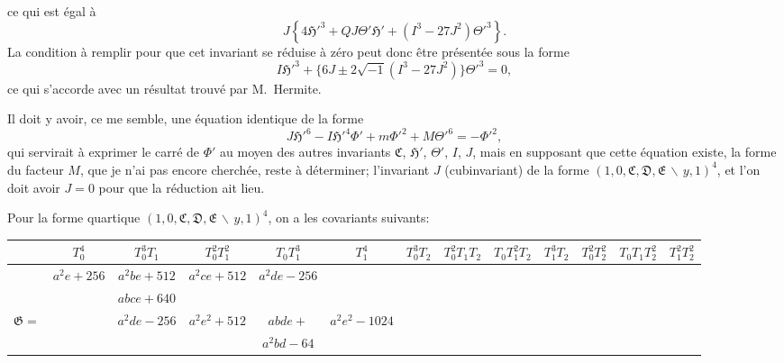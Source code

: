 \documentclass[11pt,a4paper]{article}
\theoremstyle{definition}
\begin{document}
ce qui est \'{e}gal \`{a}
\[J\left\{4\mathfrak{H}'^{3} + QJ\Theta'\mathfrak{H}' + (I^{3}-27J^{2})\Theta'^{3}\right\}.\]
La condition \`{a} remplir pour que cet invariant se r\'{e}duise \`{a} z\'{e}ro peut donc
\^{e}tre pr\'{e}sent\'{e}e sous la forme
\[I\mathfrak{H}'^{3} + \{6J \pm 2\sqrt{-1}(I^{3}-27J^{2})\}\Theta'^{3} = 0,\]
ce qui s'accorde avec un r\'{e}sultat trouv\'{e} par M.~Hermite.

Il doit y avoir, ce me semble, une \'{e}quation identique de la forme
\[J\mathfrak{H}'^{6} - I\mathfrak{H}'^{4}\Phi' + m\Phi'^{2} + M\Theta'^{6} = -\Phi'^{2},\]
qui servirait \`{a} exprimer le carr\'{e} de $\Phi'$ au moyen des autres invariants
$\mathfrak{C}$, $\mathfrak{H}'$, $\Theta'$, $I$, $J$, mais en supposant que cette \'{e}quation existe,
la forme du facteur $M$, que je n'ai pas encore cherch\'{e}e, reste \`{a} d\'{e}terminer;
l'invariant $J$ (cubinvariant) de la forme $(1,0,\mathfrak{C},\mathfrak{D},\mathfrak{E}\,\backslash\!\!\,y,1)^{4}$,
et l'on doit avoir $J = 0$ pour que la r\'{e}duction ait lieu.

\newpage

Pour la forme quartique $(1,0,\mathfrak{C},\mathfrak{D},\mathfrak{E}\,\backslash\!\!\,y,1)^{4}$,
on a les covariants suivants:

\begin{center}
\renewcommand{\arraystretch}{1.2}
\begin{tabular}{|c|c|c|c|c|c|c|c|c|c|c|c|}
\hline
& $T_{0}^{4}$ & $T_{0}^{3}T_{1}$ & $T_{0}^{2}T_{1}^{2}$ & $T_{0}T_{1}^{3}$ & $T_{1}^{4}$ & $T_{0}^{3}T_{2}$ & $T_{0}^{2}T_{1}T_{2}$ & $T_{0}T_{1}^{2}T_{2}$ & $T_{1}^{3}T_{2}$ & $T_{0}^{2}T_{2}^{2}$ & $T_{0}T_{1}T_{2}^{2}$ & $T_{1}^{2}T_{2}^{2}$ \\
\hline
& $a^{2}e+256$ & $a^{2}be+512$ & $a^{2}ce+512$ & $a^{2}de-256$ & & & & & & & & \\
& & $abce+640$ & & & & & & & & & & \\
$\mathfrak{G}=$ & & $a^{2}de-256$ & $a^{2}e^{2}+512$ & $abde+$ & $a^{2}e^{2}-1024$ & & & & & & & \\
& & & & $a^{2}bd-64$ & & & & & & & & \\
\hline
\end{tabular}
\end{center}

\newpage
\end{document}
